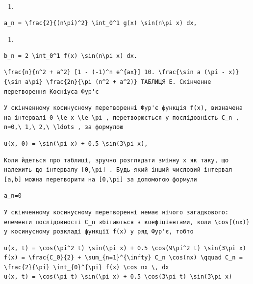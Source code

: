 \documentclass[
  ukrainian,
]{article}
\providecommand{\tightlist}{%
  \setlength{\itemsep}{0pt}\setlength{\parskip}{0pt}}
\begin{document}
\begin{enumerate}
\def\labelenumi{\arabic{enumi}.}
\tightlist
\item
\end{enumerate}

\begin{verbatim}
a_n = \frac{2}{(n\pi)^2} \int_0^1 g(x) \sin(n\pi x) dx,
\end{verbatim}

\begin{enumerate}
\def\labelenumi{\arabic{enumi}.}
\setcounter{enumi}{8}
\tightlist
\item
\end{enumerate}

\begin{verbatim}
b_n = 2 \int_0^1 f(x) \sin(n\pi x) dx.
\end{verbatim}

\begin{verbatim}
\frac{n}{n^2 + a^2} [1 - (-1)^n e^{ax}] 10. \frac{\sin a (\pi - x)}{\sin a\pi} \frac{2n}{\pi (n^2 + a^2)} ТАБЛИЦЯ E. Скінченне перетворення Косніуса Фур'є
\end{verbatim}

\begin{verbatim}
У скінченному косинусному перетворенні Фур'є функція f(x), визначена на інтервалі 0 \le x \le \pi , перетворюється у послідовність C_n , n=0,\ 1,\ 2,\ \ldots , за формулою
\end{verbatim}

\begin{verbatim}
u(x, 0) = \sin(\pi x) + 0.5 \sin(3\pi x),
\end{verbatim}

\begin{verbatim}
Коли йдеться про таблиці, зручно розглядати змінну x як таку, що належить до інтервалу [0,\pi] . Будь-який інший числовий інтервал [a,b] можна перетворити на [0,\pi] за допомогою формули
\end{verbatim}

\begin{verbatim}
a_n=0
\end{verbatim}

\begin{verbatim}
У скінченному косинусному перетворенні немає нічого загадкового: елементи послідовності C_n збігаються з коефіцієнтами, коли \cos{(nx)} у косинусному розкладі функції f(x) у ряд Фур'є, тобто
\end{verbatim}

\begin{verbatim}
u(x, t) = \cos(\pi^2 t) \sin(\pi x) + 0.5 \cos(9\pi^2 t) \sin(3\pi x)
f(x) = \frac{C_0}{2} + \sum_{n=1}^{\infty} C_n \cos(nx) \qquad C_n = \frac{2}{\pi} \int_{0}^{\pi} f(x) \cos nx \, dx
u(x, t) = \cos(\pi t) \sin(\pi x) + 0.5 \cos(3\pi t) \sin(3\pi x)
\end{verbatim}
\end{document}
